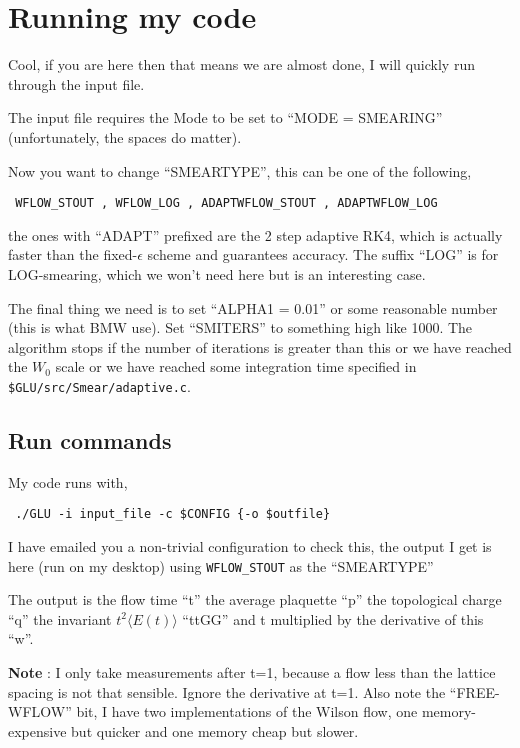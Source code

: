 \documentclass[12pt]{article}
\begin{document}
\section{Running my code}

Cool, if you are here then that means we are almost done, I will quickly run through the input file.

The input file requires the Mode to be set to ``MODE = SMEARING'' (unfortunately, the spaces do matter).

Now you want to change ``SMEARTYPE'', this can be one of the following,
\begin{verbatim}
 WFLOW_STOUT , WFLOW_LOG , ADAPTWFLOW_STOUT , ADAPTWFLOW_LOG
\end{verbatim}
the ones with ``ADAPT'' prefixed are the 2 step adaptive RK4, which is actually faster than the fixed-$\epsilon$ scheme and guarantees accuracy. The suffix ``LOG'' is for LOG-smearing, which we won't need here but is an interesting case.

The final thing we need is to set ``ALPHA1 = 0.01'' or some reasonable number (this is what BMW use). Set ``SMITERS''
to something high like 1000. The algorithm stops if the number of iterations is greater than this or we have reached
the $W_0$ scale or we have reached some integration time specified in \verb|$GLU/src/Smear/adaptive.c|.
\subsection{Run commands}

My code runs with,
\begin{verbatim}
 ./GLU -i input_file -c $CONFIG {-o $outfile}
\end{verbatim}

I have emailed you a non-trivial configuration to check this, the output I get is here (run on my desktop) using
\verb|WFLOW_STOUT| as the ``SMEARTYPE''

The output is the flow time ``{t}'' the average plaquette ``{p}'' the topological charge ``{q}'' the invariant $t^2
\langle E(t) \rangle$ ``{ttGG}'' and t multiplied by the derivative of this ``{w}''. 

\textbf{Note} : I only take measurements after t=1, because a flow less than the lattice spacing is not that sensible.
Ignore the derivative at t=1. Also note the ``FREE-WFLOW'' bit, I have two implementations of the Wilson flow, one
memory-expensive but quicker and one memory cheap but slower.
\end{document}
